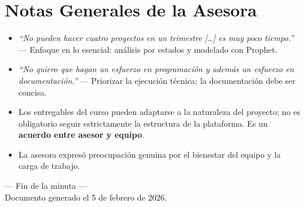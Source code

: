 \documentclass[11pt, a4paper]{article}
\begin{document}
\section{Notas Generales de la Asesora}

\begin{itemize}[leftmargin=1.5em]
    \item \textit{``No pueden hacer cuatro proyectos en un trimestre [\ldots] es muy poco tiempo.''} --- Enfoque en lo esencial: análisis por estados y modelado con Prophet.
    \item \textit{``No quiero que hagan un esfuerzo en programación y además un esfuerzo en documentación.''} --- Priorizar la ejecución técnica; la documentación debe ser concisa.
    \item Los entregables del curso pueden adaptarse a la naturaleza del proyecto; no es obligatorio seguir estrictamente la estructura de la plataforma. Es un \textbf{acuerdo entre asesor y equipo}.
    \item La asesora expresó preocupación genuina por el bienestar del equipo y la carga de trabajo.
\end{itemize}

\vfill
\begin{center}
    \small\color{imssgray}
    --- Fin de la minuta ---\\
    Documento generado el 5 de febrero de 2026.
\end{center}
\end{document}
